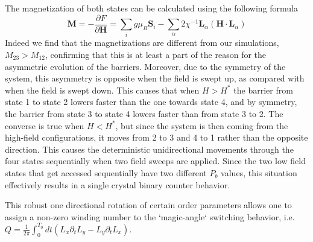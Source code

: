 The magnetization of both states can be calculated using the following formula
\begin{equation}
	\mathbf{M} = -\frac{\partial{F}}{\partial{\mathbf{H}}} = \sum_i g \mu_{B} \mathbf{S}_i - \sum_{\alpha} 2 \chi^{-1}\mathbf{L}_{\alpha} (\mathbf{H} \cdot \mathbf{L}_{\alpha}) 
\end{equation}
Indeed we find that the magnetizations are different from our simulations, $M_{23} > M_{12}$, confirming that this is at least a part of the reason for the asymmetric evolution of the barriers.
Moreover, due to the symmetry of the system, this asymmetry is opposite when the field is swept up, as compared with when the field is swept down.
This causes that when $H > H^*$ the barrier from state 1 to state 2 lowers faster than the one towards state 4, and by symmetry, the barrier from state 3 to state 4 lowers faster than from state 3 to 2.
The converse is true when $H < H^*$, but since the system is then coming from the high-field configurations, it moves from 2 to 3 and 4 to 1 rather than the opposite direction.
This causes the deterministic unidirectional movements through the four states sequentially when two field sweeps are applied.
Since the two low field states that get accessed sequentially have two different $P_b$ values, this situation effectively results in a single crystal binary counter behavior.  

This robust one directional rotation of certain order parameters allows one to assign a non-zero winding number to the `magic-angle` switching behavior, i.e. $Q=\frac{1}{2\pi}\int_0^{T_0} dt (L_x\partial_t L_y - L_y \partial_t L_x)$. 


